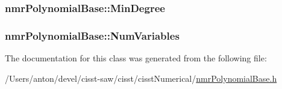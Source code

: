 \subsubsection[{Min\+Degree}]{ nmr\+Polynomial\+Base\+::\+Min\+Degree\hspace{0.3cm}{\ttfamily [protected]}}\label{classnmr_polynomial_base_a3380544a94773195706d04b22801cd6c}
\hypertarget{classnmr_polynomial_base_ac8dad4ccf2d740abc1f4d3afe8e10cd2}{}
\subsubsection[{Num\+Variables}]{ nmr\+Polynomial\+Base\+::\+Num\+Variables\hspace{0.3cm}{\ttfamily [protected]}}\label{classnmr_polynomial_base_ac8dad4ccf2d740abc1f4d3afe8e10cd2}


The documentation for this class was generated from the following file\+:\begin{DoxyCompactItemize}
\item 
/\+Users/anton/devel/cisst-\/saw/cisst/cisst\+Numerical/\hyperlink{nmr_polynomial_base_8h}{nmr\+Polynomial\+Base.\+h}\end{DoxyCompactItemize}
